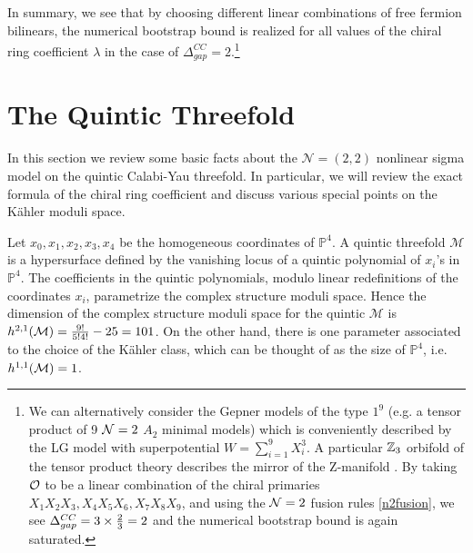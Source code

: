 \documentclass[12pt]{article}
\begin{document}
In summary, we see that by choosing different linear combinations of free fermion bilinears, the numerical bootstrap bound is realized for all values of the chiral ring coefficient $\lambda$ in the case of $\Delta^{CC}_{gap}=2$.\footnote{We can alternatively consider the Gepner models of the type $1^9$ (e.g. a tensor product of 9 ${\mathcal N}=2$ $A_2$ minimal models) which is conveniently described by the LG model with superpotential $W=\sum_{i=1}^9 X_i^3$. A particular $\mathbb{Z}_3$ orbifold of the tensor product theory describes the mirror of the Z-manifold \cite{Candelas:1993nd}. By taking $\cal O$ to be a linear combination of the chiral primaries $X_1 X_2 X_3, X_4 X_5 X_6, X_7 X_8 X_9$, and using the ${\mathcal N}=2$ fusion rules \eqref{n2fusion}, we see $\Delta_{gap}^{CC}=3\times {2\over 3}=2$ and the numerical bootstrap bound is again saturated.  
}




\section{The  Quintic Threefold}
\label{Sec:Quintic}

In this section we review some basic facts about the $\mathcal{N}=(2,2)$ nonlinear sigma model on the quintic Calabi-Yau threefold. In particular, we will review the exact formula of the chiral ring coefficient  and discuss various special points on the K\"ahler moduli space.

Let 
 $x_0,x_1,x_2,x_3,x_4$
 be the homogeneous coordinates of $\mathbb{P}^4$.  A quintic threefold $\mathcal{M}$ is   a hypersurface defined by  the vanishing locus of a  quintic polynomial of $x_i$'s in $\mathbb{P}^4$.  The coefficients in the quintic polynomials, modulo linear redefinitions of the coordinates $x_i$, parametrize the complex structure moduli space.  Hence the dimension of the complex structure moduli space for the quintic $\mathcal{M}$ is $h^{2,1}({\mathcal M})=  {9!\over 5!4! }-  25=101$.  On the other hand, there is  one parameter  associated to the choice of the  K\"ahler class, which can be thought of as the size of $\mathbb{P}^4$,  i.e. $h^{1,1}({\mathcal M})=1$.

\end{document}
